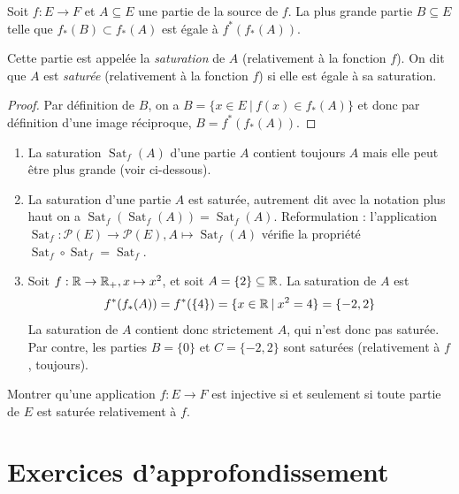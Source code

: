 \begin{propdef}
Soit $f : E\to F$ et $A \subseteq E$ une partie de la source de $f$. La plus grande partie $B\subseteq E$ telle que $f_*(B) \subset f_*(A)$ est égale à $f^*(f_*(A))$.

Cette partie est appelée la \emph{saturation} de $A$ (relativement à la fonction $f$). On dit que $A$ est \emph{saturée} (relativement à la fonction $f$) si elle est égale à sa saturation.
\end{propdef}
\begin{proof}
Par définition de $B$, on a $B = \{x\in E\:|\: f(x)\in f_*(A) \}$ et donc par définition d'une image réciproque, $B = f^*(f_*(A))$.
\end{proof}

\begin{exemple}
\begin{enumerate}
\item La saturation $\operatorname{Sat}_f(A)$ d'une partie $A$ contient toujours $A$ mais elle peut être plus grande (voir ci-dessous).
\item La saturation d'une partie $A$ est saturée, autrement dit avec la notation plus haut  on a  $\operatorname{Sat}_f(\operatorname{Sat}_f(A)) = \operatorname{Sat}_f(A)$. Reformulation : l'application $\operatorname{Sat}_f : \mathcal P(E) \to \mathcal P(E), A\mapsto \operatorname{Sat}_f(A)$ vérifie la propriété $\operatorname{Sat}_f \circ \operatorname{Sat}_f = \operatorname{Sat}_f$.
\item Soit $f : \mathbb{R}\to \mathbb{R}_+, x\mapsto x^2$, et soit $A=\{2\} \subseteq \mathbb{R}$. La saturation de $A$ est 
\[f^*(f_*(A)) = f^*(\{4\}) = \{x\in \mathbb{R}\:|\: x^2=4\} = \{-2,2\}
\]
La saturation de $A$ contient donc strictement $A$, qui n'est donc pas saturée. Par contre, les parties $B = \{0\}$ et $C=\{-2,2\}$ sont saturées (relativement à $f$, toujours).
\end{enumerate}
\end{exemple}

\begin{exercice}
Montrer qu'une application $f:E\to F$ est injective si et seulement si toute partie de $E$ est saturée relativement à $f$.
\end{exercice}







\section{Exercices d'approfondissement}

